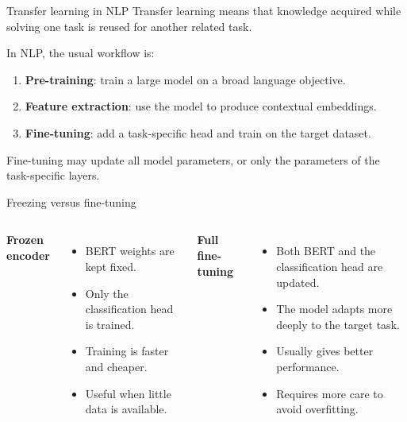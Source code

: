 \documentclass[aspectratio=169]{beamer}
\begin{document}
\begin{frame}{Transfer learning in NLP}
Transfer learning means that knowledge acquired while solving one task is reused for another related task.

\vspace{0.3cm}

In NLP, the usual workflow is:
\begin{enumerate}
    \item \textbf{Pre-training}: train a large model on a broad language objective.
    \item \textbf{Feature extraction}: use the model to produce contextual embeddings.
    \item \textbf{Fine-tuning}: add a task-specific head and train on the target dataset.
\end{enumerate}

\vspace{0.3cm}

Fine-tuning may update all model parameters, or only the parameters of the task-specific layers.
\end{frame}

\begin{frame}{Freezing versus fine-tuning}
\begin{columns}
\textbf{Frozen encoder}
\begin{itemize}
    \item BERT weights are kept fixed.
    \item Only the classification head is trained.
    \item Training is faster and cheaper.
    \item Useful when little data is available.
\end{itemize}

\textbf{Full fine-tuning}
\begin{itemize}
    \item Both BERT and the classification head are updated.
    \item The model adapts more deeply to the target task.
    \item Usually gives better performance.
    \item Requires more care to avoid overfitting.
\end{itemize}
\end{columns}
\end{frame}
\end{document}
